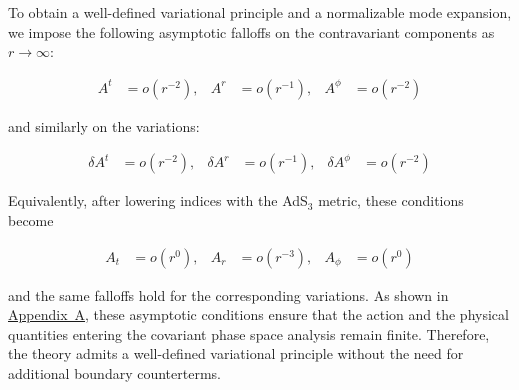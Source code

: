To obtain a well-defined variational principle and a normalizable mode expansion, we impose the following asymptotic falloffs on the contravariant components as $r \to \infty$:

\begin{align}
A^{t} & =o(r^{-2}), & A^{r} & =o(r^{-1}), & A^{\phi} & =o(r^{-2})
\end{align}

and similarly on the variations:

\begin{align}
\delta A^{t} & =o(r^{-2}), & \delta A^{r} & =o(r^{-1}), & \delta A^{\phi} & =o(r^{-2})
\end{align}

Equivalently, after lowering indices with the AdS$_3$ metric, these conditions become

\begin{align}
A_{t} & =o(r^{0}), & A_{r} & =o(r^{-3}), & A_{\phi} & =o(r^{0})
\end{align}

and the same falloffs hold for the corresponding variations. As shown in \hyperref[app:near-boundary-contributions]{Appendix~A}, these asymptotic conditions ensure that the action and the physical quantities entering the covariant phase space analysis remain finite. Therefore, the theory admits a well-defined variational principle without the need for additional boundary counterterms.

